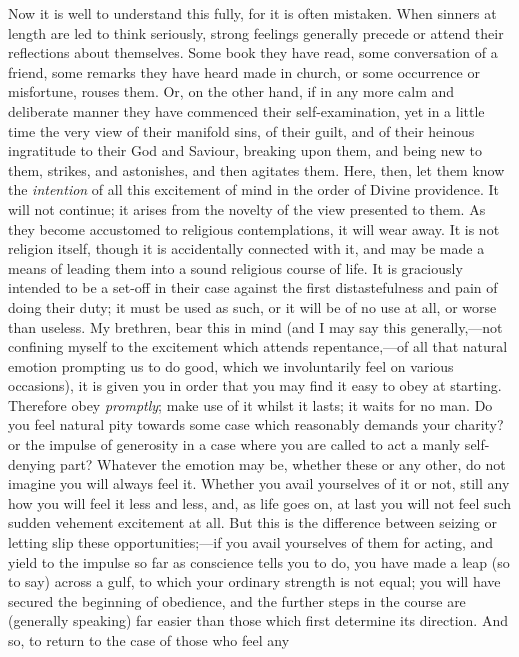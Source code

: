 Now it is well to understand this fully, for it is
often mistaken. When sinners at length are led to think
seriously, strong feelings generally precede or attend
their reflections about themselves. Some book they have
read, some conversation of a friend, some remarks they
have heard made in church, or some occurrence or
misfortune, rouses them. Or, on the other hand, if in any
more calm and deliberate manner they have commenced their
self-examination, yet in a little time the very view of
their manifold sins, of their guilt, and of their heinous
ingratitude to their God and Saviour, breaking upon them,
and being new to them, strikes, and astonishes, and then
agitates them. Here, then, let them know the \emph{intention}
of all this excitement of mind in the order of Divine
providence. It will not continue; it arises from the
novelty of the view presented to them. As they become
accustomed to religious contemplations, it will wear
away. It is not religion itself, though it is
accidentally connected with it, and may be made a means
of leading them into a sound religious course of life. It
is graciously intended to be a set-off in their case
against the first distastefulness and pain of doing their
duty; it must be used as such, or it will be of no use at
all, or worse than useless. My brethren, bear this in
mind (and I may say this generally,—not confining
myself to the excitement which attends
repentance,—of all that natural emotion prompting us
to do good, which we involuntarily feel on various
occasions), it is given you in order that you may find it
easy to obey at starting. Therefore obey \emph{promptly};
make use of it whilst it lasts; it waits for no man. Do
you feel natural pity towards some case which reasonably
demands your charity? or the impulse of generosity in a
case where you are called to act a manly self-denying
part? Whatever the emotion may be, whether these or any
other, do not imagine you will always feel it. Whether
you avail yourselves of it or not, still any how you will
feel it less and less, and, as life goes on, at last you
will not feel such sudden vehement excitement at all. But
this is the difference between seizing or letting slip
these opportunities;—if you avail yourselves of them
for acting, and yield to the impulse so far as conscience
tells you to do, you have made a leap (so to say) across
a gulf, to which your ordinary strength is not equal; you
will have secured the beginning of obedience, and the
further steps in the course are (generally speaking) far
easier than those which first determine its direction.
And so, to return to the case of those who feel any
